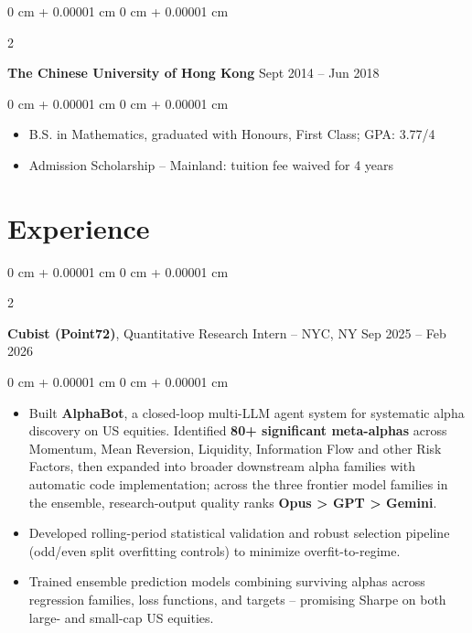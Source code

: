 \documentclass[10pt, letterpaper]{article}
\newenvironment{highlights}{
    \begin{itemize}[
        topsep=0.10 cm,
        parsep=0.10 cm,
        partopsep=0pt,
        itemsep=0pt,
        leftmargin=0 cm + 10pt
    ]
}{
    \end{itemize}
} %
\newenvironment{onecolentry}{
    \begin{adjustwidth}{
        0 cm + 0.00001 cm
    }{
        0 cm + 0.00001 cm
    }
}{
    \end{adjustwidth}
} %
\newenvironment{twocolentry}[2][]{
    \onecolentry
    \def\secondColumn{#2}
    \setcolumnwidth{\fill, 4.5 cm}
    \begin{paracol}{2}
}{
    \switchcolumn \raggedleft \secondColumn
    \end{paracol}
    \endonecolentry
} %
\begin{document}
        \vspace{0.2 cm}
        
        \begin{twocolentry}{
            Sept 2014 – Jun 2018
        }
            \textbf{The Chinese University of Hong Kong}\end{twocolentry}

        \vspace{0.10 cm}
        \begin{onecolentry}
            \begin{highlights}
                \item B.S. in Mathematics, graduated with Honours, First Class; GPA: 3.77/4
                \item Admission Scholarship – Mainland: tuition fee waived for 4 years
            \end{highlights}
        \end{onecolentry}


    \section{Experience}


        \begin{twocolentry}{
            Sep 2025 – Feb 2026
        }
            \textbf{Cubist (Point72)}, Quantitative Research Intern -- NYC, NY\end{twocolentry}

        \vspace{0.10 cm}
        \begin{onecolentry}
            \begin{highlights}
                \item Built \textbf{AlphaBot}, a closed-loop multi-LLM agent system for systematic alpha discovery on US equities. Identified \textbf{80+ significant meta-alphas} across Momentum, Mean Reversion, Liquidity, Information Flow and other Risk Factors, then expanded into broader downstream alpha families with automatic code implementation; across the three frontier model families in the ensemble, research-output quality ranks \textbf{Opus > GPT > Gemini}.
                \item Developed rolling-period statistical validation and robust selection pipeline (odd/even split overfitting controls) to minimize overfit-to-regime.
                \item Trained ensemble prediction models combining surviving alphas across regression families, loss functions, and targets -- promising Sharpe on both large- and small-cap US equities.
            \end{highlights}
        \end{onecolentry}
\end{document}
